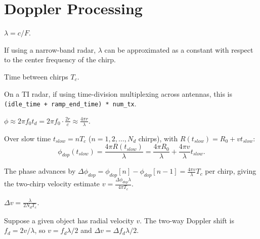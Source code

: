 \section{Doppler Processing}

\begin{definition}[Wavelength]
$\lambda = c / F$.
\end{definition}

\begin{remark}
If using a narrow-band radar, $\lambda$ can be approximated as a constant with respect to the center frequency of the chirp.
\end{remark}

\begin{definition}
Time between chirps $T_c$.
\end{definition}
\begin{remark}[TI Implementation]
On a TI radar, if using time-division multiplexing across antennas, this is \lstinline{(idle_time + ramp_end_time) * num_tx}.
\end{remark}

\begin{definition}
$\phi \approx 2\pi f_0 t_d = 2\pi f_0 \cdot \frac{2r}{c} \approx \frac{4\pi r}{\lambda}$.
\end{definition}

\begin{definition}
Over slow time $t_{slow} = nT_c$ ($n = 1, 2, \dots, N_d$ chirps), with $R(t_{slow}) = R_0 + vt_{slow}$:
$$\phi_{dop}(t_{slow}) = \frac{4\pi R(t_{slow})}{\lambda} = \frac{4\pi R_0}{\lambda} + \frac{4\pi v}{\lambda}t_{slow}.$$
\end{definition}

\begin{definition}
The phase advances by $\Delta\phi_{dop} = \phi_{dop}[n] - \phi_{dop}[n-1] = \frac{4\pi v}{\lambda}T_c$ per chirp, giving the two-chirp velocity estimate $v = \frac{\Delta\phi_{dop}\lambda}{4\pi T_c}$.
\end{definition}

\begin{definition}
$\Delta v = \frac{\lambda}{2N_dT_c}$.
\end{definition}
Suppose a given object has radial velocity $v$. The two-way Doppler shift is $f_d = 2v/\lambda$, so $v = f_d\lambda/2$ and $\Delta v = \Delta f_d \lambda / 2$.

